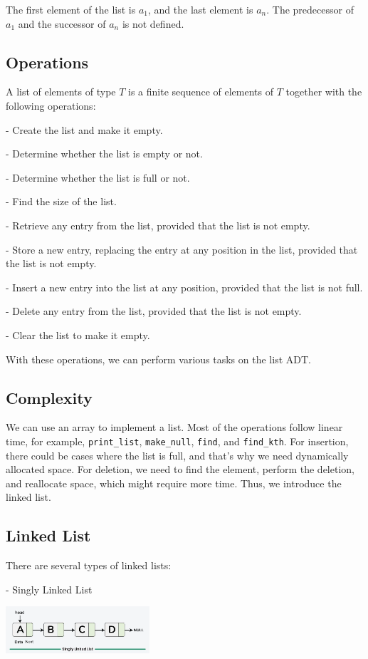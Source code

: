 The first element of the list is \(a_1\), and the last element is \(a_n\). The predecessor of \(a_1\) and the successor of \(a_n\) is not defined. 

\subsection{Operations}
A list of elements of type \(T\) is a finite sequence of elements of \(T\) together with the following operations:

- Create the list and make it empty.

- Determine whether the list is empty or not.

- Determine whether the list is full or not.

- Find the size of the list.

- Retrieve any entry from the list, provided that the list is not empty.

- Store a new entry, replacing the entry at any position in the list, provided that the list is not empty.

- Insert a new entry into the list at any position, provided that the list is not full.

- Delete any entry from the list, provided that the list is not empty.

- Clear the list to make it empty.

With these operations, we can perform various tasks on the list ADT.

\subsection{Complexity}
We can use an array to implement a list. Most of the operations follow linear time, for example, \verb|print_list|, \verb|make_null|, \verb|find|, and \verb|find_kth|. For insertion, there could be cases where the list is full, and that's why we need dynamically allocated space. For deletion, we need to find the element, perform the deletion, and reallocate space, which might require more time. Thus, we introduce the linked list.

\subsection{Linked List}
There are several types of linked lists:

- Singly Linked List  
{\par\centering
\includegraphics[width=0.4\textwidth]{Figure/singly-linked-list.png}
\par}

